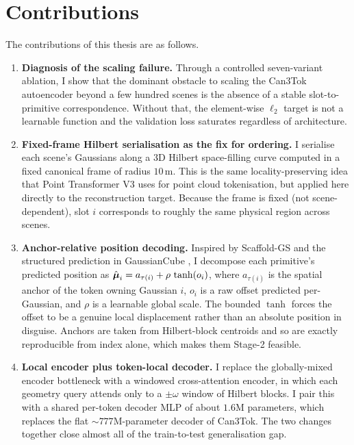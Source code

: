 \section{Contributions}
\label{sec:intro_contributions}

The contributions of this thesis are as follows.

\begin{enumerate}
\item \textbf{Diagnosis of the scaling failure.} Through a controlled seven-variant ablation, I show that the dominant obstacle to scaling the Can3Tok autoencoder beyond a few hundred scenes is the absence of a stable slot-to-primitive correspondence. Without that, the element-wise $\ell_2$ target is not a learnable function and the validation loss saturates regardless of architecture.

\item \textbf{Fixed-frame Hilbert serialisation as the fix for ordering.} I serialise each scene's Gaussians along a 3D Hilbert space-filling curve \citep{skilling2004hilbert} computed in a fixed canonical frame of radius $10$\,m. This is the same locality-preserving idea that Point Transformer V3 \citep{wu2024ptv3} uses for point cloud tokenisation, but applied here directly to the reconstruction target. Because the frame is fixed (not scene-dependent), slot $i$ corresponds to roughly the same physical region across scenes.

\item \textbf{Anchor-relative position decoding.} Inspired by Scaffold-GS \citep{lu2024scaffold} and the structured prediction in GaussianCube \citep{zhang2024gaussiancube}, I decompose each primitive's predicted position as $\hat{\boldsymbol{\mu}}_i = a_{\tau(i)} + \rho\,\tanh(o_i)$, where $a_{\tau(i)}$ is the spatial anchor of the token owning Gaussian $i$, $o_i$ is a raw offset predicted per-Gaussian, and $\rho$ is a learnable global scale. The bounded $\tanh$ forces the offset to be a genuine local displacement rather than an absolute position in disguise. Anchors are taken from Hilbert-block centroids and so are exactly reproducible from index alone, which makes them Stage-2 feasible.

\item \textbf{Local encoder plus token-local decoder.} I replace the globally-mixed encoder bottleneck with a windowed cross-attention encoder, in which each geometry query attends only to a $\pm \omega$ window of Hilbert blocks. I pair this with a shared per-token decoder MLP of about $1.6$M parameters, which replaces the flat $\sim 777$M-parameter decoder of Can3Tok. The two changes together close almost all of the train-to-test generalisation gap.


\end{enumerate}
